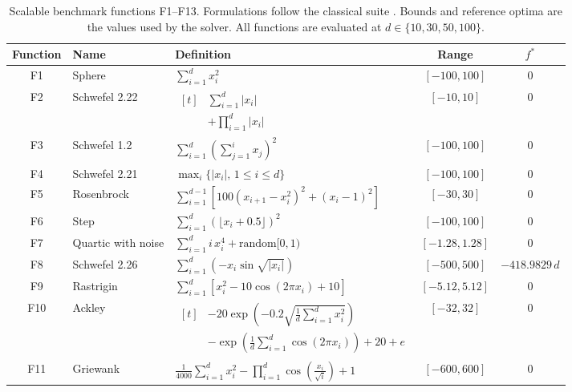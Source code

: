 \begin{table}[H]
\centering
\small
\caption{Scalable benchmark functions F1--F13. Formulations follow the classical suite \cite{Yao1999,Abualigah2021}. Bounds and reference optima are the values used by the solver. All functions are evaluated at $d\in\{10,30,50,100\}$.}
\label{tab:benchmark_scalable}
\setlength{\tabcolsep}{4pt}
\begin{tabularx}{\textwidth}{c>{\raggedright\arraybackslash}p{2.2cm}>{\footnotesize\raggedright\arraybackslash}X cc}
\toprule
\textbf{Function} & \textbf{Name} & \textbf{Definition} & \textbf{Range} & \boldmath$f^{*}$ \\
\midrule
F1 & Sphere & $\sum_{i=1}^{d} x_i^{2}$ & $[-100,100]$ & $0$ \\
F2 & Schwefel 2.22 & $\begin{aligned}[t]&\sum_{i=1}^{d}|x_i|\\&+\prod_{i=1}^{d}|x_i|\end{aligned}$ & $[-10,10]$ & $0$ \\
F3 & Schwefel 1.2 & $\sum_{i=1}^{d}\left(\sum_{j=1}^{i} x_j\right)^{2}$ & $[-100,100]$ & $0$ \\
F4 & Schwefel 2.21 & $\max_i\{|x_i|,\, 1\le i\le d\}$ & $[-100,100]$ & $0$ \\
F5 & Rosenbrock & $\sum_{i=1}^{d-1}\left[100\left(x_{i+1}-x_i^{2}\right)^{2}+(x_i-1)^{2}\right]$ & $[-30,30]$ & $0$ \\
F6 & Step & $\sum_{i=1}^{d}\left(\lfloor x_i+0.5\rfloor\right)^{2}$ & $[-100,100]$ & $0$ \\
F7 & Quartic with noise & $\sum_{i=1}^{d} i\,x_i^{4} + \mathrm{random}[0,1)$ & $[-1.28,1.28]$ & $0$ \\
\midrule
F8 & Schwefel 2.26 & $\sum_{i=1}^{d}\left(-x_i\sin\sqrt{|x_i|}\right)$ & $[-500,500]$ & $-418.9829\,d$ \\
F9 & Rastrigin & $\sum_{i=1}^{d}\left[x_i^{2}-10\cos(2\pi x_i)+10\right]$ & $[-5.12,5.12]$ & $0$ \\
F10 & Ackley & $\begin{aligned}[t]&-20\exp\!\left(-0.2\sqrt{\tfrac{1}{d}\textstyle\sum_{i=1}^{d}x_i^{2}}\right)\\&-\exp\!\left(\tfrac{1}{d}\textstyle\sum_{i=1}^{d}\cos(2\pi x_i)\right)+20+e\end{aligned}$ & $[-32,32]$ & $0$ \\
F11 & Griewank & $\tfrac{1}{4000}\sum_{i=1}^{d}x_i^{2}-\prod_{i=1}^{d}\cos\!\left(\tfrac{x_i}{\sqrt{i}}\right)+1$ & $[-600,600]$ & $0$ \\

\end{tabularx}
\end{table}
